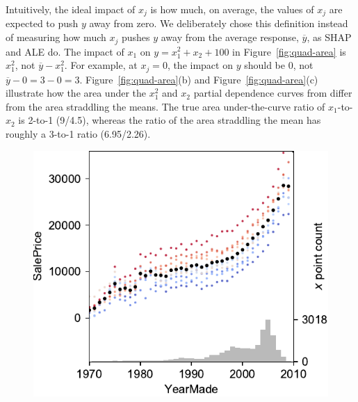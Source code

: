 \documentclass[11pt]{article}
\newcommand{\figref}[1]{Figure~\ref{#1}}
\begin{document}
Intuitively, the ideal impact of $x_j$ is how much, on average, the values of $x_j$ are expected to push $y$ away from zero. We deliberately chose this  definition instead of measuring how much $x_j$ pushes $y$ away from the average response, $\overline{y}$, as SHAP and ALE do. The impact of $x_1$ on $y = x_1^2+x_2+100$ in \figref{fig:quad-area} is $x_1^2$, not $\overline{y} - x_1^2$.  For example, at $x_j=0$, the impact on $y$ should be 0, not $\overline{y}-0 = 3 - 0 = 3$.  \figref{fig:quad-area}(b) and \figref{fig:quad-area}(c) illustrate how the area under the $x_1^2$ and $x_2$ partial dependence curves from  differ from the area straddling the means. The true area under-the-curve ratio of $x_1$-to-$x_2$ is 2-to-1 (9/4.5), whereas the ratio of the area straddling the mean has roughly a 3-to-1 ratio (6.95/2.26). 

\begin{figure}[htbp]
\begin{center}
\includegraphics[scale=0.5]{images/bulldozer-YearMade.pdf}
\label{fig:yearmade}
\end{center}
\end{figure}
\end{document}
